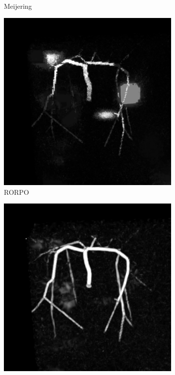 \begin{figure}[!ht]
\begin{subfigure}[t]{0.32\textwidth}
    \caption{Meijering}
  \end{subfigure}
  \begin{subfigure}[t]{0.32\textwidth}
    \includegraphics[clip = true, trim = 80 80 80 80,width=\textwidth]{Images/Vascu_4_RORPO.png}
    \caption{RORPO}
  \end{subfigure}
  \begin{subfigure}[t]{0.32\textwidth}
    \includegraphics[clip = true, trim = 80 80 80 80,width=\textwidth]{Images/Vascu_4_Sato.png}

\end{subfigure}
\end{figure}
